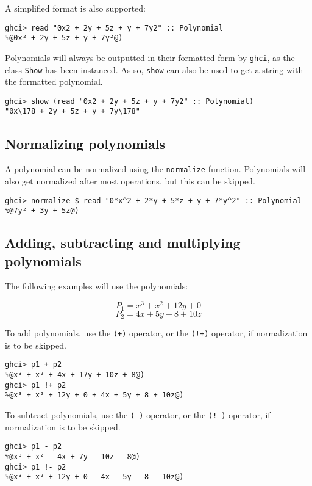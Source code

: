 \documentclass[11pt,a4paper]{article}
\begin{document}
A simplified format is also supported:

\begin{lstlisting}
ghci> read "0x2 + 2y + 5z + y + 7y2" :: Polynomial
%@0x² + 2y + 5z + y + 7y²@)
\end{lstlisting}

Polynomials will always be outputted in their formatted form by \lstinline{ghci}, as the class \lstinline{Show} has been instanced.
As so, \lstinline{show} can also be used to get a string with the formatted polynomial.

\begin{lstlisting}
ghci> show (read "0x2 + 2y + 5z + y + 7y2" :: Polynomial)
"0x\178 + 2y + 5z + y + 7y\178"
\end{lstlisting}

\subsection{Normalizing polynomials}

A polynomial can be normalized using the \lstinline{normalize} function.
Polynomials will also get normalized after most operations, but this can be skipped.

\begin{lstlisting}
ghci> normalize $ read "0*x^2 + 2*y + 5*z + y + 7*y^2" :: Polynomial
%@7y² + 3y + 5z@)
\end{lstlisting}

\subsection{Adding, subtracting and multiplying polynomials}

The following examples will use the polynomials:

$$ P_1 = x^3 + x^2 + 12y + 0 $$
$$ P_2 = 4x + 5y + 8 + 10z $$

To add polynomials, use the \lstinline{(+)} operator, or the \lstinline{(!+)} operator, if normalization is to be skipped.

\begin{lstlisting}
ghci> p1 + p2
%@x³ + x² + 4x + 17y + 10z + 8@)
ghci> p1 !+ p2
%@x³ + x² + 12y + 0 + 4x + 5y + 8 + 10z@)
\end{lstlisting}

To subtract polynomials, use the \lstinline{(-)} operator, or the \lstinline{(!-)} operator, if normalization is to be skipped.

\begin{lstlisting}
ghci> p1 - p2
%@x³ + x² - 4x + 7y - 10z - 8@)
ghci> p1 !- p2
%@x³ + x² + 12y + 0 - 4x - 5y - 8 - 10z@)
\end{lstlisting}
\end{document}
